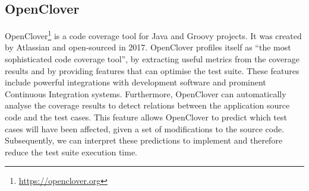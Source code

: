 
\subsection{OpenClover}
OpenClover\footnote{\url{https://openclover.org}} is a code coverage tool for Java and Groovy projects. It was created by Atlassian and open-sourced in 2017. OpenClover profiles itself as ``the most sophisticated code coverage tool'', by extracting useful metrics from the coverage results and by providing features that can optimise the test suite. These features include powerful integrations with development software and prominent Continuous Integration systems. Furthermore, OpenClover can automatically analyse the coverage results to detect relations between the application source code and the test cases. This feature allows OpenClover to predict which test cases will have been affected, given a set of modifications to the source code. Subsequently, we can interpret these predictions to implement \tcs{} and therefore reduce the test suite execution time.